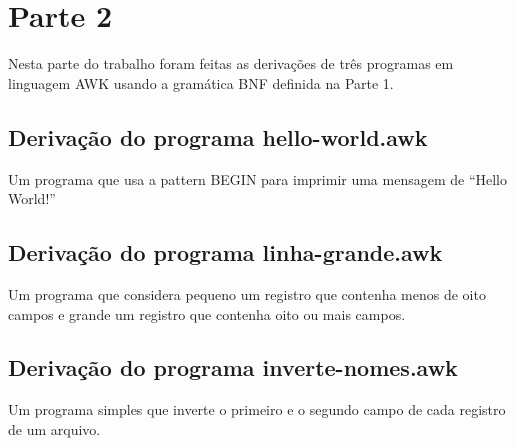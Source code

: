 \section{Parte 2}

Nesta parte do trabalho foram feitas as derivações de três programas em linguagem AWK 
usando a gramática BNF definida na Parte 1.

\subsection{Derivação do programa hello-world.awk}

Um programa que usa a pattern BEGIN para imprimir uma mensagem de ``Hello World!''




\subsection{Derivação do programa linha-grande.awk}

Um programa que considera pequeno um registro que contenha menos de oito campos
e grande um registro que contenha oito ou mais campos.




\newpage

\subsection{Derivação do programa inverte-nomes.awk}

Um programa simples que inverte o primeiro e o segundo campo
de cada registro de um arquivo.




